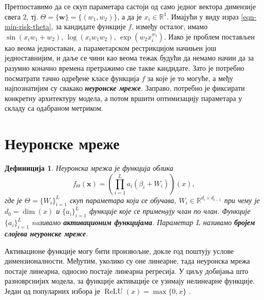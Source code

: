 \documentclass[12pt, a4paper, twoside]{book}
\numberwithin{equation}{chapter}
\numberwithin{theorem}{section}
\newtheorem{definition}{Дефиниција}
\numberwithin{definition}{section}
\numberwithin{definitionChapter}{chapter}
\begin{document}
Претпоставимо да се скуп параметара састоји од само једног вектора димензије свега $2$,
тј. $\Theta = \{\mathbf{w}\} = \{(w_1, w_2)\}$,
а да је $x_i \in \mathbb{R}^{1}$. Имајући у виду израз \ref{eqn-min-risk-theta}, за кандидате
функције $f$, између осталог, имамо $\sin(x_i w_1 + w_2)$, $\log(x_i w_1 w_2)$,
$\exp(w_2x_i^{w_1})$. Иако је проблем постављен као веома једноставан, а параметарском
рестрикцијом начињен још једноставнијим, и даље се чини као веома тежак будући да немамо
начин да за разумно коначно времена претражимо све такве кандидате. Зато је потребно посматрати
тачно одређене класе функција $f$ за које је то могуће, а међу најпознатијим су свакако
\textbf{\textit{неуронске мреже}}. Заправо, потребно је фиксирати конкретну архитектуру модела, а
потом вршити оптимизацију параметара у складу са одабраном метриком.

\section{Неуронске мреже}
%
%

\begin{definition}
	Неуронска мрежа је функција облика
	$$f_{\Theta}(\mathbf{x}) = \left(\prod_{i=1}^{L}a_i(\beta_i + W_i)\right) (x),$$
	где је $\Theta = \{W_i\}_{i=1}^{L}$ скуп параметара који се обучава,
	$W_i \in \mathbb{R}^{d_i \times d_{i-1}}$ при чему је $d_0 = \dim(x)$ и
	$\{a_i\}_{i=1}^{L}$ функције које се примењују члан по члан. Функције
	$\{a_i\}_{i=1}^{L}$ naзивамо \textbf{активационим функцијама}.
	Параметар $L$ називамо \textbf{бројем слојева неуронске мреже}.
\end{definition}
Активационе функције могу бити произвољне, докле год поштују услове димензионалности. Међутим,
уколико су оне линеарне, тада неуронска мрежа постаје линеарна, односно постаје линеарна регресија.
У циљу добијања што разноврснијих модела, за функције активације се узимају нелинеарне функције.
Један од популарних избора је $\operatorname{ReLU}(x) = \max\{0, x\}$ \cite{relu}.
\end{document}

